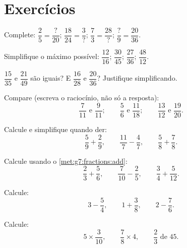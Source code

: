 \section{Exercícios}

\begin{exercise}[$\star$]\label{exo:g7:fractions:1}
Complete: $\dfrac{2}{5} = \dfrac{?}{20}$; \quad
$\dfrac{18}{24} = \dfrac{3}{?}$; \quad
$\dfrac{7}{3} = \dfrac{28}{?}$; \quad
$\dfrac{?}{9} = \dfrac{20}{36}$.
\end{exercise}

\begin{exercise}[$\star$]\label{exo:g7:fractions:2}
Simplifique o máximo possível:
$\dfrac{12}{16}$; \quad $\dfrac{30}{45}$; \quad $\dfrac{27}{36}$;
\quad $\dfrac{48}{12}$.
\end{exercise}

\begin{exercise}[$\star$]\label{exo:g7:fractions:3}
$\dfrac{15}{35}$ e $\dfrac{21}{49}$ são iguais? E $\dfrac{16}{28}$ e
$\dfrac{20}{36}$? Justifique simplificando.
\end{exercise}

\begin{exercise}[$\star$]\label{exo:g7:fractions:4}
Compare (escreva o raciocínio, não só a resposta):
\[
\frac{7}{11} \text{ e } \frac{9}{11}; \qquad
\frac{5}{6} \text{ e } \frac{11}{18}; \qquad
\frac{13}{12} \text{ e } \frac{19}{20}.
\]
\end{exercise}

\begin{exercise}[$\star$]\label{exo:g7:fractions:5}
Calcule e simplifique quando der:
\[
\frac{5}{9} + \frac{2}{9}, \qquad
\frac{11}{7} - \frac{4}{7}, \qquad
\frac{5}{8} + \frac{7}{8} .
\]
\end{exercise}

\begin{exercise}[$\star$]\label{exo:g7:fractions:6}
Calcule usando o \cref{met:g7:fractions:add}:
\[
\frac{2}{3} + \frac{5}{6}, \qquad
\frac{7}{10} - \frac{2}{5}, \qquad
\frac{3}{4} + \frac{5}{12} .
\]
\end{exercise}

\begin{exercise}[$\star$]\label{exo:g7:fractions:7}
Calcule:
\[
3 - \frac{5}{4}, \qquad
1 + \frac{3}{8}, \qquad
2 - \frac{7}{6} .
\]
\end{exercise}

\begin{exercise}[$\star$]\label{exo:g7:fractions:8}
Calcule:
\[
5 \times \frac{3}{10}, \qquad
\frac{7}{8} \times 4, \qquad
\frac{2}{3} \text{ de } 45 .
\]
\end{exercise}


